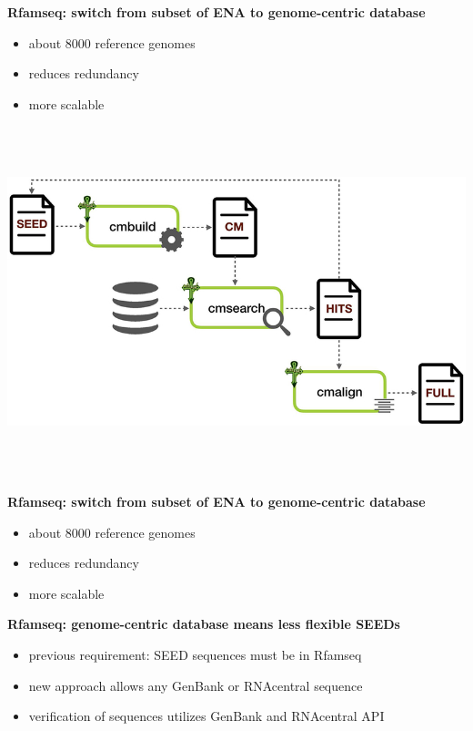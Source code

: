 \documentclass[landscape]{slides}
\begin{document}
\begin{slide}
\begin{center}
  \textbf{Rfamseq: switch from subset of ENA to genome-centric database}
  \begin{itemize}  
  \item about 8000 reference genomes
  \item reduces redundancy
  \item more scalable
  \end{itemize}
\vspace{0.5in}
\includegraphics[height=4in]{figs/kalvari18-rfam-schema}
\end{center}    
\vfill
\tiny {}
\end{slide}
\begin{slide}
\begin{center}
  \textbf{Rfamseq: switch from subset of ENA to genome-centric database}
  \begin{itemize}  
  \item about 8000 reference genomes
  \item reduces redundancy
  \item more scalable
  \end{itemize}

  \textbf{Rfamseq: genome-centric database means less flexible SEEDs}
  \begin{itemize}  
  \item previous requirement: SEED sequences must be in Rfamseq
  \item new approach allows any GenBank or RNAcentral sequence
  \item verification of sequences utilizes GenBank and RNAcentral API
  \end{itemize}
\end{center}    
\vfill
\end{slide}
\end{document}
